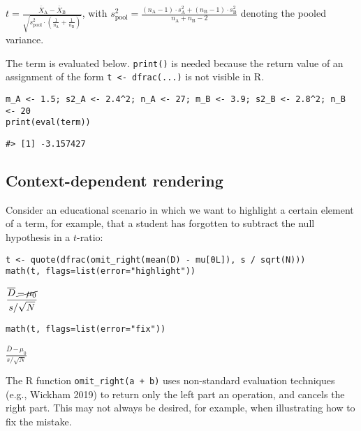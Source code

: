 \({t}{=}{\displaystyle{\frac{{{\overline{X}}_{\mathrm{A}}}{-}{{\overline{X}}_{\mathrm{B}}}}{\sqrt{{{s}_{\mathrm{pool}}^{2}}{\cdot}{\left({\frac{1}{{n}_{\mathrm{A}}}}{+}{\frac{1}{{n}_{\mathrm{B}}}}\right)}}}}}\), with \({{s}_{\mathrm{pool}}^{2}}{=}{\frac{{{\left({{n}_{\mathrm{A}}}{-}{1}\right)}{\cdot}{{s}_{\mathrm{A}}^{2}}}{+}{{\left({{n}_{\mathrm{B}}}{-}{1}\right)}{\cdot}{{s}_{\mathrm{B}}^{2}}}}{{{{n}_{\mathrm{A}}}{+}{{n}_{\mathrm{B}}}}{-}{2}}}\) denoting the pooled variance.

The term is evaluated below. \texttt{print()} is needed because the return value of an
assignment of the form \texttt{t\ \textless{}-\ dfrac(...)} is not visible in R.

\begin{verbatim}
m_A <- 1.5; s2_A <- 2.4^2; n_A <- 27; m_B <- 3.9; s2_B <- 2.8^2; n_B <- 20
print(eval(term))
\end{verbatim}

\begin{verbatim}
#> [1] -3.157427
\end{verbatim}

\hypertarget{context-dependent-rendering}{%
\subsection{Context-dependent rendering}\label{context-dependent-rendering}}

Consider an educational scenario in which we want to highlight a certain
element of a term, for example, that a student has forgotten to subtract the
null hypothesis in a \(t\)-ratio:

\begin{verbatim}
t <- quote(dfrac(omit_right(mean(D) - mu[0L]), s / sqrt(N)))
math(t, flags=list(error="highlight"))
\end{verbatim}

\(\displaystyle{\frac{{\overline{D}}{{\,}{\cancel{{-}{{\,}{{\mu}_{0}}}}}}}{{s}{/}{\sqrt{N}}}}\)

\begin{verbatim}
math(t, flags=list(error="fix"))
\end{verbatim}

\(\displaystyle{\frac{{\overline{D}}{{\,}{\boxed{{-}{{\,}{{\mu}_{0}}}}}}}{{s}{/}{\sqrt{N}}}}\)

The R function \texttt{omit\_right(a\ +\ b)} uses non-standard evaluation
techniques (e.g., Wickham 2019) to return only the left part an operation,
and cancels the right part. This may not always be desired, for example, when
illustrating how to fix the mistake.

